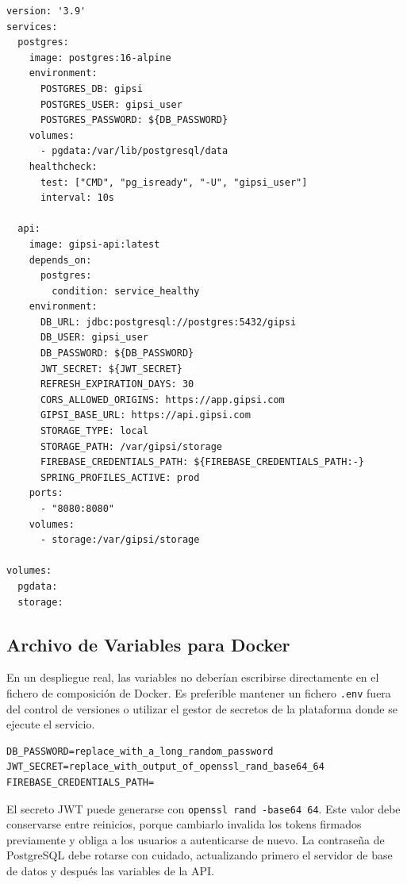 \documentclass[12pt,a4paper,twoside]{report}
\begin{document}
\begin{lstlisting}[style=yamlStyle, caption={docker-compose.yml para producción}, label={lst:docker}]
version: '3.9'
services:
  postgres:
    image: postgres:16-alpine
    environment:
      POSTGRES_DB: gipsi
      POSTGRES_USER: gipsi_user
      POSTGRES_PASSWORD: ${DB_PASSWORD}
    volumes:
      - pgdata:/var/lib/postgresql/data
    healthcheck:
      test: ["CMD", "pg_isready", "-U", "gipsi_user"]
      interval: 10s

  api:
    image: gipsi-api:latest
    depends_on:
      postgres:
        condition: service_healthy
    environment:
      DB_URL: jdbc:postgresql://postgres:5432/gipsi
      DB_USER: gipsi_user
      DB_PASSWORD: ${DB_PASSWORD}
      JWT_SECRET: ${JWT_SECRET}
      REFRESH_EXPIRATION_DAYS: 30
      CORS_ALLOWED_ORIGINS: https://app.gipsi.com
      GIPSI_BASE_URL: https://api.gipsi.com
      STORAGE_TYPE: local
      STORAGE_PATH: /var/gipsi/storage
      FIREBASE_CREDENTIALS_PATH: ${FIREBASE_CREDENTIALS_PATH:-}
      SPRING_PROFILES_ACTIVE: prod
    ports:
      - "8080:8080"
    volumes:
      - storage:/var/gipsi/storage

volumes:
  pgdata:
  storage:
\end{lstlisting}

\subsection{Archivo de Variables para Docker}

En un despliegue real, las variables no deberían escribirse directamente en el
fichero de composición de Docker. Es preferible mantener un fichero
\texttt{.env} fuera del control de versiones o utilizar el gestor de secretos
de la plataforma donde se ejecute el servicio.

\begin{lstlisting}[style=yamlStyle, caption={Ejemplo de fichero .env de producción}, label={lst:env-docker}]
DB_PASSWORD=replace_with_a_long_random_password
JWT_SECRET=replace_with_output_of_openssl_rand_base64_64
FIREBASE_CREDENTIALS_PATH=
\end{lstlisting}

El secreto JWT puede generarse con \texttt{openssl rand -base64 64}. Este valor
debe conservarse entre reinicios, porque cambiarlo invalida los tokens firmados
previamente y obliga a los usuarios a autenticarse de nuevo. La contraseña de
PostgreSQL debe rotarse con cuidado, actualizando primero el servidor de base de
datos y después las variables de la API.
\end{document}

